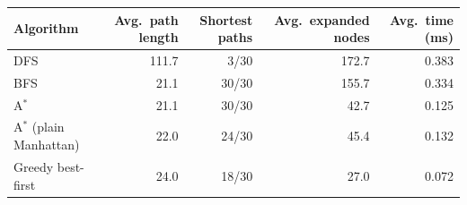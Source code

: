 \begin{tabular}{lrrrr}
\toprule
Algorithm & Avg.\ path length & Shortest paths & Avg.\ expanded nodes & Avg.\ time (ms) \\
\midrule
DFS & 111.7 & 3/30 & 172.7 & 0.383 \\
BFS & 21.1 & 30/30 & 155.7 & 0.334 \\
A$^*$ & 21.1 & 30/30 & 42.7 & 0.125 \\
A$^*$ (plain Manhattan) & 22.0 & 24/30 & 45.4 & 0.132 \\
Greedy best-first & 24.0 & 18/30 & 27.0 & 0.072 \\
\bottomrule
\end{tabular}
